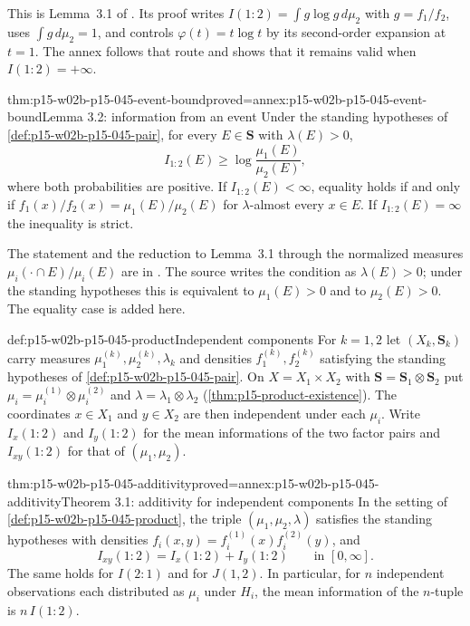 This is Lemma~3.1 of \cite[p.~82]{KullbackLeibler1951Information}. Its
proof writes \(I(1:2)=\int g\log g\,d\mu_2\) with \(g=f_1/f_2\), uses
\(\int g\,d\mu_2=1\), and controls \(\varphi(t)=t\log t\) by its
second-order expansion at \(t=1\). The annex follows that route and
shows that it remains valid when \(I(1:2)=+\infty\).

\begin{hblemma}{thm:p15-w02b-p15-045-event-bound}{proved=annex:p15-w02b-p15-045-event-bound}{Lemma 3.2: information from an event}
Under the standing hypotheses of \cref{def:p15-w02b-p15-045-pair}, for
every \(E\in\mathbf S\) with \(\lambda(E)>0\),
\[
  I_{1:2}(E)\geq\log\frac{\mu_1(E)}{\mu_2(E)},
\]
where both probabilities are positive. If \(I_{1:2}(E)<\infty\),
equality holds if and only if \(f_1(x)/f_2(x)=\mu_1(E)/\mu_2(E)\) for
\(\lambda\)-almost every \(x\in E\). If \(I_{1:2}(E)=\infty\) the
inequality is strict.
\end{hblemma}

The statement and the reduction to Lemma~3.1 through the normalized
measures \(\mu_i(\cdot\cap E)/\mu_i(E)\) are in
\cite[p.~82]{KullbackLeibler1951Information}. The source writes the
condition as \(\lambda(E)>0\); under the standing hypotheses this is
equivalent to \(\mu_1(E)>0\) and to \(\mu_2(E)>0\). The equality case is
added here.

\begin{hbdefinition}{def:p15-w02b-p15-045-product}{Independent components}
For \(k=1,2\) let \((X_k,\mathbf S_k)\) carry measures
\(\mu_1^{(k)},\mu_2^{(k)},\lambda_k\) and densities
\(f_1^{(k)},f_2^{(k)}\) satisfying the standing hypotheses of
\cref{def:p15-w02b-p15-045-pair}. On \(X=X_1\times X_2\) with
\(\mathbf S=\mathbf S_1\otimes\mathbf S_2\) put
\(\mu_i=\mu_i^{(1)}\otimes\mu_i^{(2)}\) and
\(\lambda=\lambda_1\otimes\lambda_2\)
(\cref{thm:p15-product-existence}). The coordinates \(x\in X_1\) and
\(y\in X_2\) are then independent under each \(\mu_i\). Write
\(I_x(1:2)\) and \(I_y(1:2)\) for the mean informations of the two
factor pairs and \(I_{xy}(1:2)\) for that of \((\mu_1,\mu_2)\).
\end{hbdefinition}

\begin{hbtheorem}{thm:p15-w02b-p15-045-additivity}{proved=annex:p15-w02b-p15-045-additivity}{Theorem 3.1: additivity for independent components}
In the setting of \cref{def:p15-w02b-p15-045-product}, the triple
\((\mu_1,\mu_2,\lambda)\) satisfies the standing hypotheses with
densities \(f_i(x,y)=f_i^{(1)}(x)f_i^{(2)}(y)\), and
\[
  I_{xy}(1:2)=I_x(1:2)+I_y(1:2)\qquad\text{in }[0,\infty].
\]
The same holds for \(I(2:1)\) and for \(J(1,2)\). In particular, for
\(n\) independent observations each distributed as \(\mu_i\) under
\(H_i\), the mean information of the \(n\)-tuple is \(n\,I(1:2)\).
\end{hbtheorem}

